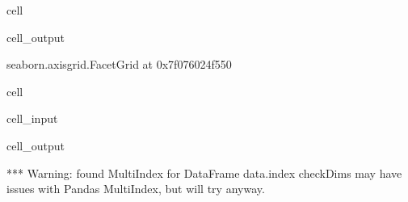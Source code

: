 \documentclass[letterpaper,table,10pt,english]{jupyterBook}
\begin{document}
\begin{sphinxuseclass}{cell}
\begin{sphinxVerbatimOutput}
\begin{sphinxuseclass}{cell_output}
\begin{sphinxVerbatim}[commandchars=\\\{\}]
\PYGZlt{}seaborn.axisgrid.FacetGrid at 0x7f076024f550\PYGZgt{}
\end{sphinxVerbatim}

\noindent{}

\end{sphinxuseclass}\end{sphinxVerbatimOutput}

\end{sphinxuseclass}
\begin{sphinxuseclass}{cell}\begin{sphinxVerbatimInput}

\begin{sphinxuseclass}{cell_input}
\begin{sphinxVerbatim}[commandchars=\\\{\}]
   
       
                      
\end{sphinxVerbatim}

\end{sphinxuseclass}\end{sphinxVerbatimInput}
\begin{sphinxVerbatimOutput}

\begin{sphinxuseclass}{cell_output}
\begin{sphinxVerbatim}[commandchars=\\\{\}]
*** Warning: found MultiIndex for DataFrame data.index \PYGZhy{} checkDims may have issues with Pandas MultiIndex, but will try anyway.
\end{sphinxVerbatim}


\end{sphinxuseclass}
\end{sphinxVerbatimOutput}
\end{sphinxuseclass}
\end{document}
